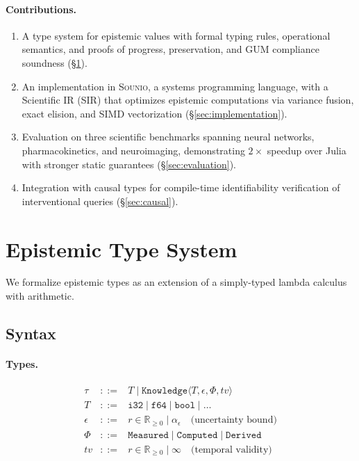 \documentclass[acmsmall,screen,review,anonymous]{acmart}
\newcommand{\sounio}{\textsc{Sounio}\xspace}
\newcommand{\knowfull}[4]{\texttt{Knowledge}\langle #1, #2, #3, #4 \rangle}
\newcommand{\eps}{\epsilon}
\begin{document}
\paragraph{Contributions.}
\begin{enumerate}
  \item A type system for epistemic values with formal typing rules,
        operational semantics, and proofs of progress, preservation,
        and GUM compliance soundness (\S\ref{sec:type-system}).
  \item An implementation in \sounio, a systems programming language,
        with a Scientific IR (SIR) that optimizes epistemic computations
        via variance fusion, exact elision, and SIMD vectorization
        (\S\ref{sec:implementation}).
  \item Evaluation on three scientific benchmarks spanning neural networks,
        pharmacokinetics, and neuroimaging, demonstrating $2\times$ speedup
        over Julia with stronger static guarantees
        (\S\ref{sec:evaluation}).
  \item Integration with causal types for compile-time identifiability
        verification of interventional queries (\S\ref{sec:causal}).
\end{enumerate}

\section{Epistemic Type System}
\label{sec:type-system}

We formalize epistemic types as an extension of a simply-typed lambda calculus
with arithmetic.

\subsection{Syntax}

\paragraph{Types.}
\[
\begin{array}{rcl}
\tau & ::= & T \mid \knowfull{T}{\eps}{\Phi}{\mathit{tv}} \\
T & ::= & \texttt{i32} \mid \texttt{f64} \mid \texttt{bool} \mid \ldots \\
\eps & ::= & r \in \mathbb{R}_{\geq 0} \mid \alpha_\eps \quad \text{(uncertainty bound)} \\
\Phi & ::= & \texttt{Measured} \mid \texttt{Computed} \mid \texttt{Derived} \\
\mathit{tv} & ::= & r \in \mathbb{R}_{\geq 0} \mid \infty \quad \text{(temporal validity)}
\end{array}
\]
\end{document}
